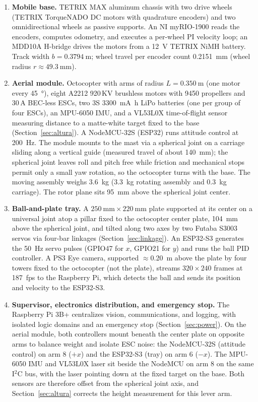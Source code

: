 \begin{enumerate}[label=\textbf{N\arabic*.}]
  \item \textbf{Mobile base.} TETRIX MAX aluminum chassis with two drive wheels (TETRIX TorqueNADO DC motors with quadrature encoders) and two omnidirectional wheels as passive supports. An NI myRIO-1900 reads the encoders, computes odometry, and executes a per-wheel PI velocity loop; an MDD10A H-bridge drives the motors from a \SI{12}{\volt} TETRIX NiMH battery. Track width $b=\SI{0.3794}{\metre}$; wheel travel per encoder count \SI{0.2151}{\milli\metre} (wheel radius $r\approx\SI{49.3}{\milli\metre}$).
  \item \textbf{Aerial module.} Octocopter with arms of radius $L=\SI{0.350}{\metre}$ (one motor every \SI{45}{\degree}), eight A2212 920\,KV brushless motors with 9450 propellers and 30\,A BEC-less ESCs, two 3S \SI{3300}{\milli\ampere\hour} LiPo batteries (one per group of four ESCs), an MPU-6050 IMU, and a VL53L0X time-of-flight sensor measuring distance to a matte-white target fixed to the base (Section~\ref{sec:altura}). A NodeMCU-32S (ESP32) runs attitude control at \SI{200}{\hertz}. The module mounts to the mast via a spherical joint on a carriage sliding along a vertical guide (measured travel of about \SI{140}{\milli\metre}); the spherical joint leaves roll and pitch free while friction and mechanical stops permit only a small yaw rotation, so the octocopter turns with the base. The moving assembly weighs \SI{3.6}{\kilo\gram} (\SI{3.3}{\kilo\gram} rotating assembly and \SI{0.3}{\kilo\gram} carriage). The rotor plane sits \SI{95}{\milli\metre} above the spherical joint center.
  \item \textbf{Ball-and-plate tray.} A $\SI{250}{\milli\metre}\times\SI{220}{\milli\metre}$ plate supported at its center on a universal joint atop a pillar fixed to the octocopter center plate, \SI{104}{\milli\metre} above the spherical joint, and tilted along two axes by two Futaba S3003 servos via four-bar linkages (Section~\ref{sec:linkage}). An ESP32-S3 generates the \SI{50}{\hertz} servo pulses (GPIO47 for $x$, GPIO21 for $y$) and runs the ball PID controller. A PS3 Eye camera, supported $\approx$\SI{0.20}{\metre} above the plate by four towers fixed to the octocopter (not the plate), streams $320\times240$ frames at \SI{187}{fps} to the Raspberry Pi, which detects the ball and sends its position and velocity to the ESP32-S3.
  \item \textbf{Supervisor, electronics distribution, and emergency stop.} The Raspberry Pi 3B+ centralizes vision, communications, and logging, with isolated logic domains and an emergency stop (Section~\ref{sec:power}). On the aerial module, both controllers mount beneath the center plate on opposite arms to balance weight and isolate ESC noise: the NodeMCU-32S (attitude control) on arm 8 ($+x$) and the ESP32-S3 (tray) on arm 6 ($-x$). The MPU-6050 IMU and VL53L0X laser sit beside the NodeMCU on arm 8 on the same I$^2$C bus, with the laser pointing down at the fixed target on the base. Both sensors are therefore offset from the spherical joint axis, and Section~\ref{sec:altura} corrects the height measurement for this lever arm.
\end{enumerate}

